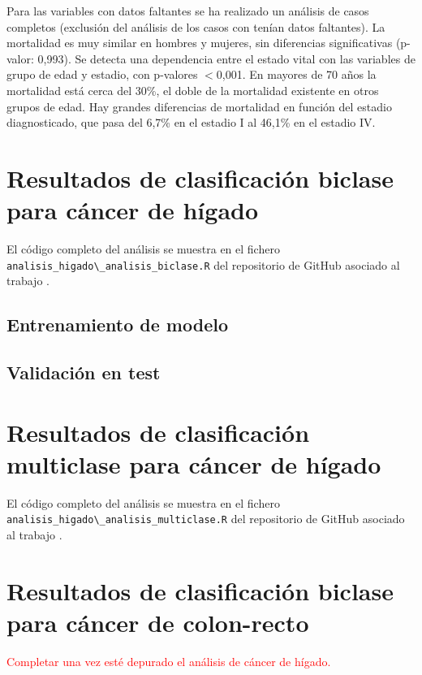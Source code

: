 Para las variables con datos faltantes se ha realizado un análisis de casos completos (exclusión del análisis de los casos con tenían datos faltantes).  La mortalidad es muy similar en hombres y mujeres, sin diferencias significativas (p-valor: 0,993). Se detecta una dependencia entre el estado vital con las variables de grupo de edad y estadio, con p-valores $<$0,001. En mayores de 70 años la mortalidad está cerca del 30\%, el doble de la mortalidad existente en otros grupos de edad. Hay grandes diferencias de mortalidad en función del estadio diagnosticado, que pasa del 6,7\% en el estadio I al 46,1\% en el estadio IV.

\section{Resultados de clasificación biclase para cáncer de hígado}

El código completo del análisis se muestra en el fichero \texttt{analisis\_higado\textbackslash{}\_analisis\_biclase.R} del repositorio de GitHub asociado al trabajo \cite{Redondo-Sanchez2020}.\\

\subsection{Entrenamiento de modelo}

\subsection{Validación en test}

\section{Resultados de clasificación multiclase para cáncer de hígado}

El código completo del análisis se muestra en el fichero \texttt{analisis\_higado\textbackslash{}\_analisis\_multiclase.R} del repositorio de GitHub asociado al trabajo \cite{Redondo-Sanchez2020}.\\

\section{Resultados de clasificación biclase para cáncer de colon-recto}

\textcolor{red}{Completar una vez esté depurado el análisis de cáncer de hígado.}

